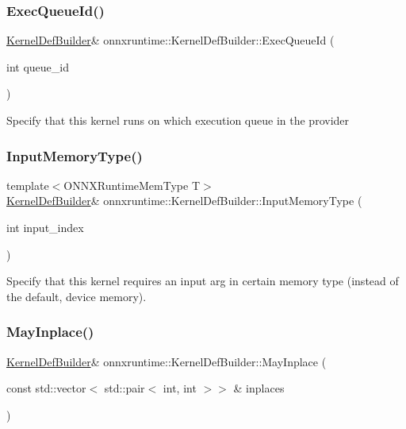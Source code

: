 \subsubsection{\texorpdfstring{Exec\+Queue\+Id()}{ExecQueueId()}}
{\footnotesize\ttfamily \mbox{\hyperlink{classonnxruntime_1_1KernelDefBuilder}{Kernel\+Def\+Builder}}\& onnxruntime\+::\+Kernel\+Def\+Builder\+::\+Exec\+Queue\+Id (\begin{DoxyParamCaption}\item[{int}]{queue\+\_\+id }\end{DoxyParamCaption})\hspace{0.3cm}{\ttfamily [inline]}}

Specify that this kernel runs on which execution queue in the provider \mbox{\label{classonnxruntime_1_1KernelDefBuilder_a0d017e27105e5d62bedb95cd110c2819}} 
\subsubsection{\texorpdfstring{Input\+Memory\+Type()}{InputMemoryType()}}
{\footnotesize\ttfamily template$<$O\+N\+N\+X\+Runtime\+Mem\+Type T$>$ \\
\mbox{\hyperlink{classonnxruntime_1_1KernelDefBuilder}{Kernel\+Def\+Builder}}\& onnxruntime\+::\+Kernel\+Def\+Builder\+::\+Input\+Memory\+Type (\begin{DoxyParamCaption}\item[{int}]{input\+\_\+index }\end{DoxyParamCaption})\hspace{0.3cm}{\ttfamily [inline]}}

Specify that this kernel requires an input arg in certain memory type (instead of the default, device memory). \mbox{\label{classonnxruntime_1_1KernelDefBuilder_a5384a86c2c9aeab28fc66522020408a6}} 
\subsubsection{\texorpdfstring{May\+Inplace()}{MayInplace()}\hspace{0.1cm}{\footnotesize\ttfamily [1/2]}}
{\footnotesize\ttfamily \mbox{\hyperlink{classonnxruntime_1_1KernelDefBuilder}{Kernel\+Def\+Builder}}\& onnxruntime\+::\+Kernel\+Def\+Builder\+::\+May\+Inplace (\begin{DoxyParamCaption}\item[{const std\+::vector$<$ std\+::pair$<$ int, int $>$$>$ \&}]{inplaces }\end{DoxyParamCaption})\hspace{0.3cm}{\ttfamily [inline]}}

